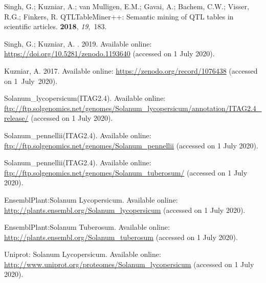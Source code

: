\documentclass[applsci,article,accept,moreauthors,pdftex]{Definitions/mdpi}
\begin{document}
{\begin{thebibliography}{999}
{
Singh, G.; Kuzniar, A.; van Mulligen, E.M.; Gavai, A.; Bachem, C.W.; Visser,
  R.G.; Finkers, R.
\newblock QTLTableMiner++: Semantic mining of QTL tables in scientific
  articles.
 {\bf 2018}, {\em 19},~183.

Singh, G.; Kuzniar, A.
.  2019.
\newblock Available online:  \url{https://doi.org/10.5281/zenodo.1193640}
\newblock (accessed on 1 July 2020).

Kuzniar, A.
 2017.
\newblock Available online:  \url{https://zenodo.org/record/1076438}
\newblock (accessed on \mbox{1 July 2020}).

{Solanum{\_}lycopersicum(ITAG2.4)}.
\newblock
  Available online:  \url{ftp://ftp.solgenomics.net/genomes/Solanum_lycopersicum/annotation/ITAG2.4_release/}
\newblock (accessed on 1 July 2020).

{Solanum{\_}pennellii(ITAG2.4)}.
\newblock Available online:  \url{ftp://ftp.solgenomics.net/genomes/Solanum_pennellii}
\newblock (accessed on 1 July 2020).

{Solanum{\_}pennellii(ITAG2.4)}.
\newblock Available online:  \url{ftp://ftp.solgenomics.net/genomes/Solanum_tuberosum/}
\newblock (accessed on 1 July 2020).

{EnsemblPlant:Solanum Lycopersicum}.
\newblock Available online:  \url{http://plants.ensembl.org/Solanum_lycopersicum}
\newblock (accessed on 1 July 2020).

{EnsemblPlant:Solanum Tuberosum}.
\newblock Available online:  \url{http://plants.ensembl.org/Solanum_tuberosum}
\newblock (accessed on 1 July 2020).

{Uniprot: Solanum Lycopersicum}.
\newblock Available online:   \url{http://www.uniprot.org/proteomes/Solanum_lycopersicum}
\newblock (accessed on 1 July 2020).

}
\end{thebibliography}}
\end{document}
